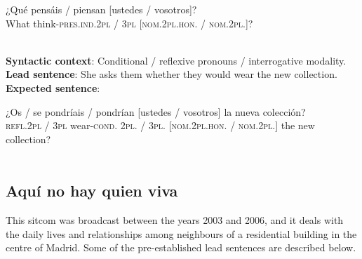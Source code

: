 \documentclass[output=paper]{LSP/langsci}
\begin{document}
\begin{enumerate}
\ea
\gll
{¿Qué}    {pensáis / piensan}           {[ustedes / vosotros]?}\\
What  {think-\textsc{pres.ind.2pl / 3pl}}    {\textsc{[nom.2pl.hon. / nom.2pl.]}?}\\
\\
\z

\textbf{Syntactic context}: Conditional / reflexive pronouns / interrogative modality.\\
\textbf{Lead sentence}: She asks them whether they would wear the new collection.\\
\textbf{Expected sentence}:

\ea
\gll
{¿Os / se} {pondríais / pondrían}     {[ustedes / vosotros]}   la nueva colección?\\     
{\textsc{refl.2pl / 3pl}}  {wear-\textsc{cond. 2pl. / 3pl.}}  {\textsc{[nom.2pl.hon. / nom.2pl.]}} the new collection?\\
\\
\z

\end{enumerate}

\subsection{Aquí no hay quien viva}
This sitcom was broadcast between the years 2003 and 2006, and it deals with the daily lives and relationships among neighbours of a residential building in the centre of Madrid. Some of the pre-established lead sentences are described below.
\end{document}
